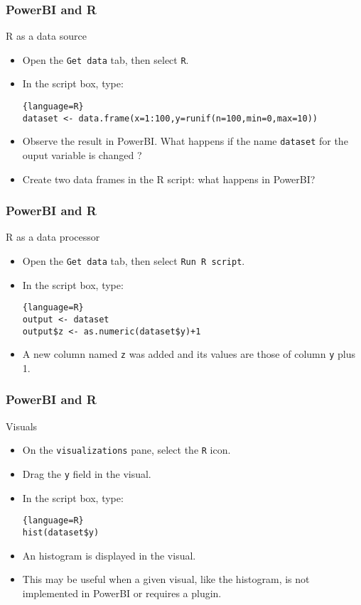 \begin{frame}[fragile]
    \frametitle{PowerBI and R}
\begin{block}{R as a data source}
    \begin{itemize}
        \item<+-> Open the \texttt{Get data} tab, then select \texttt{R}.
        \item<+-> In the script box, type:
        \begin{lstlisting}{language=R}
dataset <- data.frame(x=1:100,y=runif(n=100,min=0,max=10))
        \end{lstlisting}
        \item<+-> Observe the result in PowerBI. What happens if the name \texttt{dataset} for the ouput variable is changed ?
        \item<+-> Create two data frames in the R script: what happens in PowerBI?
    \end{itemize}
\end{block}
\end{frame}
\begin{frame}[fragile]
    \frametitle{PowerBI and R}
\begin{block}{R as a data processor}
    \begin{itemize}
        \item<+-> Open the \texttt{Get data} tab, then select \texttt{Run R script}.
        \item<+-> In the script box, type:
        \begin{lstlisting}{language=R}
output <- dataset
output$z <- as.numeric(dataset$y)+1
        \end{lstlisting}
        \item<+-> A new column named \texttt{z} was added and its values are those of column \texttt{y} plus 1.
    \end{itemize}
\end{block}
\end{frame}
\begin{frame}[fragile]
    \frametitle{PowerBI and R}
\begin{block}{Visuals}
    \begin{itemize}
        \item<+-> On the \texttt{visualizations} pane, select the \texttt{R} icon.
        \item<+-> Drag the \texttt{y} field in the visual.
        \item<+-> In the script box, type:
        \begin{lstlisting}{language=R}
hist(dataset$y)
        \end{lstlisting}
        \item<+-> An histogram is displayed in the visual. 
        \item<+-> This may be useful when a given visual, like the histogram, is not implemented in PowerBI or requires a plugin.
    \end{itemize}
\end{block}
\end{frame}
    
